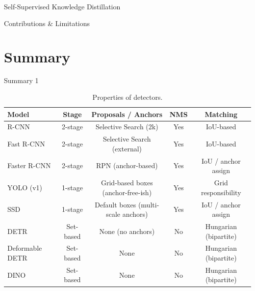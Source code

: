 \documentclass[xcolor=dvipsnames,aspectratio=169]{beamer}
\begin{document}
            \begin{frame}{Self-Supervised Knowledge Distillation}
                
            \end{frame}

            \begin{frame}{Contributions \& Limitations}
                
            \end{frame}

    \section{Summary}
        \begin{frame}{Summary 1}
            \begin{table}
                \tiny
                \setlength{\tabcolsep}{3pt}
                \renewcommand{\arraystretch}{1.35}
                \begin{tabular}{|l|c|c|c|c|}
                    \hline
                    \textbf{Model} & \textbf{Stage} & \textbf{Proposals / Anchors} & \textbf{NMS} & \textbf{Matching} \\
                    \hline
                    R-CNN & 2-stage & Selective Search (2k) & Yes & IoU-based \\
                    \hline
                    Fast R-CNN & 2-stage & Selective Search (external) & Yes & IoU-based \\
                    \hline
                    Faster R-CNN & 2-stage & RPN (anchor-based) & Yes & IoU / anchor assign \\
                    \hline
                    YOLO (v1) & 1-stage & Grid-based boxes (anchor-free-ish) & Yes & Grid responsibility \\
                    \hline
                    SSD & 1-stage & Default boxes (multi-scale anchors) & Yes & IoU / anchor assign \\
                    \hline
                    DETR & Set-based & None (no anchors) & No & Hungarian (bipartite) \\
                    \hline
                    Deformable DETR & Set-based & None & No & Hungarian (bipartite) \\
                    \hline
                    DINO & Set-based & None & No & Hungarian (bipartite) \\
                    \hline
                \end{tabular}
                \caption{Properties of detectors.}
            \end{table}
        \end{frame}    
\end{document}
